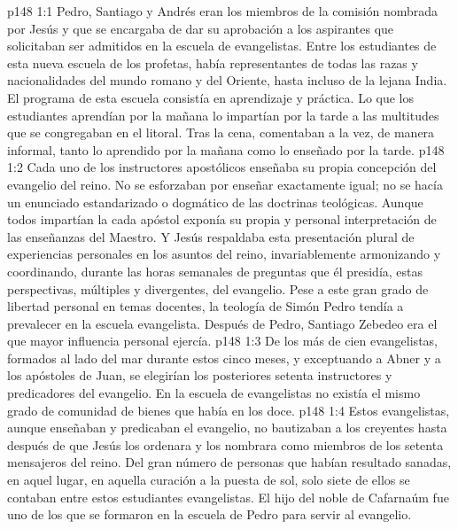 \vs p148 1:1 Pedro, Santiago y Andrés eran los miembros de la comisión nombrada por Jesús y que se encargaba de dar su aprobación a los aspirantes que solicitaban ser admitidos en la escuela de evangelistas. Entre los estudiantes de esta nueva escuela de los profetas, había representantes de todas las razas y nacionalidades del mundo romano y del Oriente, hasta incluso de la lejana India. El programa de esta escuela consistía en aprendizaje y práctica. Lo que los estudiantes aprendían por la mañana lo impartían por la tarde a las multitudes que se congregaban en el litoral. Tras la cena, comentaban a la vez, de manera informal, tanto lo aprendido por la mañana como lo enseñado por la tarde.
\vs p148 1:2 Cada uno de los instructores apostólicos enseñaba su propia concepción del evangelio del reino. No se esforzaban por enseñar exactamente igual; no se hacía un enunciado estandarizado o dogmático de las doctrinas teológicas. Aunque todos impartían la  cada apóstol exponía su propia y personal interpretación de las enseñanzas del Maestro. Y Jesús respaldaba esta presentación plural de experiencias personales en los asuntos del reino, invariablemente armonizando y coordinando, durante las horas semanales de preguntas que él presidía, estas perspectivas, múltiples y divergentes, del evangelio. Pese a este gran grado de libertad personal en temas docentes, la teología de Simón Pedro tendía a prevalecer en la escuela evangelista. Después de Pedro, Santiago Zebedeo era el que mayor influencia personal ejercía.
\vs p148 1:3 De los más de cien evangelistas, formados al lado del mar durante estos cinco meses, y exceptuando a Abner y a los apóstoles de Juan, se elegirían los posteriores setenta instructores y predicadores del evangelio. En la escuela de evangelistas no existía el mismo grado de comunidad de bienes que había en los doce.
\vs p148 1:4 Estos evangelistas, aunque enseñaban y predicaban el evangelio, no bautizaban a los creyentes hasta después de que Jesús los ordenara y los nombrara como miembros de los setenta mensajeros del reino. Del gran número de personas que habían resultado sanadas, en aquel lugar, en aquella curación a la puesta de sol, solo siete de ellos se contaban entre estos estudiantes evangelistas. El hijo del noble de Cafarnaúm fue uno de los que se formaron en la escuela de Pedro para servir al evangelio.
